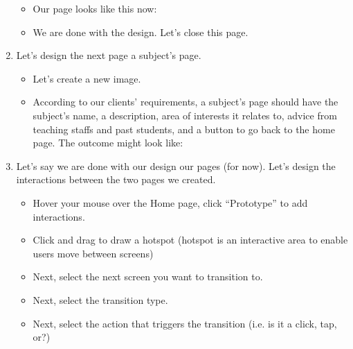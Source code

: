 \documentclass[letterpaper,10pt,english]{jupyterBook}
\begin{document}
\begin{enumerate}
\begin{itemize}
\item {} 
\sphinxAtStartPar
Our page looks like this now:

\item {} 
\sphinxAtStartPar
We are done with the design.  Let’s close this page.

\end{itemize}

\item {} 
\sphinxAtStartPar
Let’s design the next page \sphinxhyphen{} a subject’s page.
\begin{itemize}
\item {} 
\sphinxAtStartPar
Let’s create a new image.

\item {} 
\sphinxAtStartPar
According to our clients’ requirements, a subject’s page should have the subject’s name, a description, area of
interests it relates to, advice from teaching staffs and past students, and a button to go back to the home page.
The outcome might look like:

\end{itemize}

\item {} 
\sphinxAtStartPar
Let’s say we are done with our design our pages (for now).  Let’s design the interactions between the two pages
we created.
\begin{itemize}
\item {} 
\sphinxAtStartPar
Hover your mouse over the Home page, click “Prototype” to add interactions.

\item {} 
\sphinxAtStartPar
Click and drag to draw a hotspot (hotspot is an interactive area to enable users move between screens)

\item {} 
\sphinxAtStartPar
Next, select the next screen you want to transition to. 

\item {} 
\sphinxAtStartPar
Next, select the transition type. 

\item {} 
\sphinxAtStartPar
Next, select the action that triggers the transition (i.e. is it a click, tap, or?) 


\end{itemize}
\end{enumerate}
\end{document}

